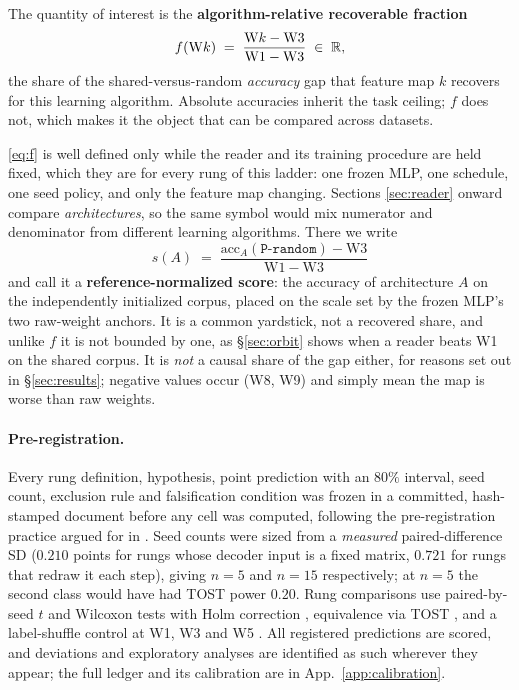 The quantity of interest is the \textbf{algorithm-relative recoverable fraction}
\begin{equation}
f(\mathrm{W}k) \;=\; \frac{\mathrm{W}k - \mathrm{W3}}{\mathrm{W1} - \mathrm{W3}} \;\in\; \mathbb{R},
\label{eq:f}
\end{equation}
the share of the shared-versus-random \emph{accuracy} gap that feature map $k$ recovers for this
learning algorithm. Absolute accuracies inherit the task ceiling; $f$ does not, which makes it the
object that can be compared across datasets.

\eqref{eq:f} is well defined only while the reader and its training procedure are held fixed, which
they are for every rung of this ladder: one frozen MLP, one schedule, one seed policy, and only the
feature map changing. Sections \ref{sec:reader} onward compare \emph{architectures}, so the same
symbol would mix numerator and denominator from different learning algorithms. There we write
\begin{equation}
s(A) \;=\; \frac{\mathrm{acc}_A(\texttt{P-random}) - \mathrm{W3}}{\mathrm{W1} - \mathrm{W3}}
\label{eq:s}
\end{equation}
and call it a \textbf{reference-normalized score}: the accuracy of architecture $A$ on the
independently initialized corpus, placed on the scale set by the frozen MLP's two raw-weight
anchors. It is a common yardstick, not a recovered share, and unlike $f$ it is not bounded by one,
as \S\ref{sec:orbit} shows when a reader beats W1 on the shared corpus. It is \emph{not} a causal
share of the gap either, for
reasons set out in \S\ref{sec:results}; negative values occur (W8, W9) and simply mean the map is
worse than raw weights.

\paragraph{Pre-registration.} Every rung definition, hypothesis, point prediction with an $80\%$
interval, seed count, exclusion rule and falsification condition was frozen in a committed,
hash-stamped document before any cell was computed, following the pre-registration practice
argued for in \citep{munafo2017manifesto,nosek2018preregistration}. Seed counts were sized from a
\emph{measured} paired-difference SD ($0.210$ points for rungs whose decoder input is a fixed
matrix, $0.721$ for rungs that redraw it each step), giving $n=5$ and $n=15$ respectively;
at $n=5$ the second class would have had TOST power $0.20$. Rung comparisons use paired-by-seed
$t$ and Wilcoxon tests with Holm correction \citep{holm1979simple}, equivalence via TOST
\citep{schuirmann1987tost}, and a label-shuffle control at W1, W3 and W5
\citep{zhang2017rethinking}. All registered predictions are scored, and deviations and exploratory
analyses are identified as such wherever they appear; the full ledger and its calibration are in
App.~\ref{app:calibration}.

